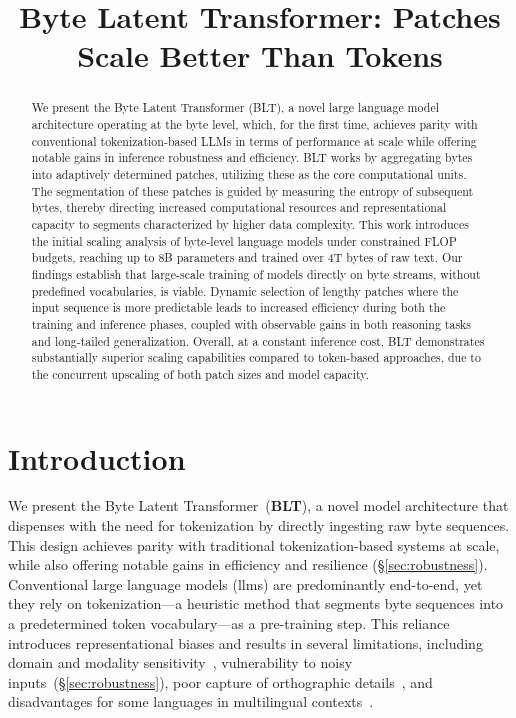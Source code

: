 \title{Byte Latent Transformer: Patches Scale Better Than Tokens}

\begin{abstract}
We present the Byte Latent Transformer ({\textsc BLT}), a novel large language model architecture operating at the byte level, which, for the first time, achieves parity with conventional tokenization-based LLMs in terms of performance at scale while offering notable gains in inference robustness and efficiency. {\textsc BLT} works by aggregating bytes into adaptively determined patches, utilizing these as the core computational units. The segmentation of these patches is guided by measuring the entropy of subsequent bytes, thereby directing increased computational resources and representational capacity to segments characterized by higher data complexity. This work introduces the initial scaling analysis of byte-level language models under constrained FLOP budgets, reaching up to 8B parameters and trained over 4T bytes of raw text. Our findings establish that large-scale training of models directly on byte streams, without predefined vocabularies, is viable. Dynamic selection of lengthy patches where the input sequence is more predictable leads to increased efficiency during both the training and inference phases, coupled with observable gains in both reasoning tasks and long-tailed generalization. Overall, at a constant inference cost, {\textsc BLT} demonstrates substantially superior scaling capabilities compared to token-based approaches, due to the concurrent upscaling of both patch sizes and model capacity.
\end{abstract}

\section{Introduction}
\label{section:intro}

We present the Byte Latent Transformer~(\textbf{BLT}), a novel model architecture that dispenses with the need for tokenization by directly ingesting raw byte sequences. This design achieves parity with traditional tokenization-based systems at scale, while also offering notable gains in efficiency and resilience (\S\ref{sec:robustness}). 
Conventional large language models (llms) are predominantly end-to-end, yet they rely on tokenization—a heuristic method that segments byte sequences into a predetermined token vocabulary—as a pre-training step. This reliance introduces representational biases and results in several limitations, including domain and modality sensitivity~\citep{dagangetting}, vulnerability to noisy inputs~(\S\ref{sec:robustness}), poor capture of orthographic details~\citep{edman2024cute}, and disadvantages for some languages in multilingual contexts~\citep{liang2023xlm,petrov2024language,limisiewicz2024myte}.

